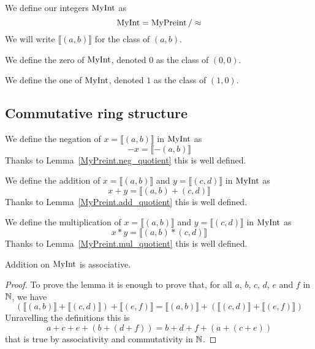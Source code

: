 \begin{definition}
    \label{MyInt}
    \leanok
    We define our integers $\mathrm{MyInt}$ as
\[
\mathrm{MyInt} = \mathrm{MyPreint} \, / \approx
\]
We will write $⟦ (a, b) ⟧$ for the class of $(a,b)$.
\end{definition}

\begin{definition}
    \label{MyInt.zero}
    \leanok
We define the zero of $\mathrm{MyInt}$, denoted $0$ as the class of $(0,0)$.
\end{definition}

\begin{definition}
    \label{MyInt.one}
    \leanok
We define the one of $\mathrm{MyInt}$, denoted $1$ as the class of $(1,0)$.
\end{definition}

\subsection{Commutative ring structure}

\begin{definition}
    \label{MyInt.neg}
    \leanok
We define the negation of $x = ⟦ (a, b) ⟧$ in $\mathrm{MyInt}$ as
\[
-x = ⟦ -(a, b) ⟧
\]
Thanks to Lemma~\ref{MyPreint.neg_quotient} this is well defined.
\end{definition}

\begin{definition}
    \label{MyInt.add}
    \leanok
We define the addition of $x = ⟦ (a, b) ⟧$ and $y = ⟦ (c, d) ⟧$ in $\mathrm{MyInt}$ as
\[
x + y = ⟦ (a, b)+(c,d) ⟧
\]
Thanks to Lemma~\ref{MyPreint.add_quotient} this is well defined.
\end{definition}

\begin{definition}
    \label{MyInt.mul}
    \leanok
We define the multiplication of $x = ⟦ (a, b) ⟧$ and $y = ⟦ (c, d) ⟧$ in $\mathrm{MyInt}$ as
\[
x * y = ⟦ (a, b)*(c,d) ⟧
\]
Thanks to Lemma~\ref{MyPreint.mul_quotient} this is well defined.
\end{definition}

\begin{lemma}
    \label{MyInt.add_assoc}
    \leanok
    Addition on $\mathrm{MyInt}$ is associative.
\end{lemma}
\begin{proof}
    \leanok
To prove the lemma it is enough to prove that, for all $a$, $b$, $c$, $d$, $e$ and $f$ in $\mathbb{N}$, we have
\[
(⟦ (a, b) ⟧+ ⟦ (c, d) ⟧) + ⟦ (e, f) ⟧ = ⟦ (a, b) ⟧ + (⟦ (c, d) ⟧ + ⟦ (e, f) ⟧)
\]
Unravelling the definitions this is
\[
a + c + e + (b + (d + f)) = b + d + f + (a + (c + e))
\]
that is true by associativity and commutativity in $\mathbb{N}$.
\end{proof}

